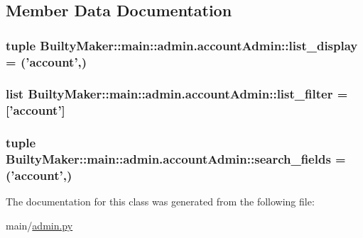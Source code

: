 \subsection{\-Member \-Data \-Documentation}
\hypertarget{classBuiltyMaker_1_1main_1_1admin_1_1accountAdmin_a21a45718b86569d95b1a5accaffc2f36}{
\subsubsection[{list\-\_\-display}]{\setlength{\rightskip}{0pt plus 5cm}tuple {\bf \-Builty\-Maker\-::main\-::admin.\-account\-Admin\-::list\-\_\-display} = ('{\bf account}',)}}\label{classBuiltyMaker_1_1main_1_1admin_1_1accountAdmin_a21a45718b86569d95b1a5accaffc2f36}
\hypertarget{classBuiltyMaker_1_1main_1_1admin_1_1accountAdmin_a9f4b96560b69e526648212075f088618}{
\subsubsection[{list\-\_\-filter}]{\setlength{\rightskip}{0pt plus 5cm}list {\bf \-Builty\-Maker\-::main\-::admin.\-account\-Admin\-::list\-\_\-filter} = \mbox{[}'{\bf account}'\mbox{]}}}\label{classBuiltyMaker_1_1main_1_1admin_1_1accountAdmin_a9f4b96560b69e526648212075f088618}
\hypertarget{classBuiltyMaker_1_1main_1_1admin_1_1accountAdmin_a0d9936f2c7e0e29d7c99ee6c0e2c29cd}{
\subsubsection[{search\-\_\-fields}]{\setlength{\rightskip}{0pt plus 5cm}tuple {\bf \-Builty\-Maker\-::main\-::admin.\-account\-Admin\-::search\-\_\-fields} = ('{\bf account}',)}}\label{classBuiltyMaker_1_1main_1_1admin_1_1accountAdmin_a0d9936f2c7e0e29d7c99ee6c0e2c29cd}


\-The documentation for this class was generated from the following file\-:\begin{DoxyCompactItemize}
\item 
main/\hyperlink{admin_8py}{admin.\-py}\end{DoxyCompactItemize}
